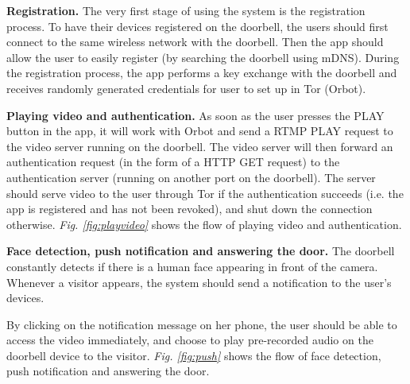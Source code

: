 \textbf{Registration.} The very first stage of using the system is the registration process. To have their devices registered on the doorbell, the users should first connect to the same wireless network with the doorbell. Then the app should allow the user to easily register (by searching the doorbell using mDNS). During the registration process, the app performs a key exchange with the doorbell and receives randomly generated credentials for user to set up in Tor (Orbot).

\textbf{Playing video and authentication.} As soon as the user presses the PLAY button in the app, it will work with Orbot and send a RTMP PLAY request to the video server running on the doorbell. The video server will then forward an authentication request (in the form of a HTTP GET request) to the authentication server (running on another port on the doorbell). The server should serve video to the user through Tor if the authentication succeeds (i.e. the app is registered and has not been revoked), and shut down the connection otherwise.
\textit{Fig. \ref{fig:playvideo}} shows the flow of playing video and authentication.

\textbf{Face detection, push notification and answering the door.} The doorbell constantly detects if there is a human face appearing in front of the camera. Whenever a visitor appears, the system should send a notification to the user's devices.

By clicking on the notification message on her phone, the user should be able to access the video immediately, and choose to play pre-recorded audio on the doorbell device to the visitor.
\textit{Fig. \ref{fig:push}} shows the flow of face detection, push notification and answering the door.

